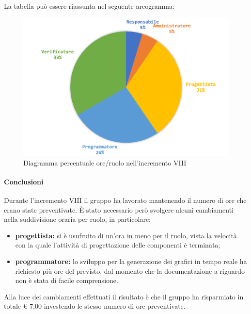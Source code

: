 		
		La tabella può essere riassunta nel seguente areogramma:
		\begin{figure}[H]
			\centering
			\includegraphics[width=0.8\linewidth]{images/consuntivo/ConsIncr8-2.png}
			\caption{Diagramma percentuale ore/ruolo nell'incremento VIII}
			\label{fig:consuntivo diagramma costi ruolo incremento VIII}
		\end{figure}
		
		\paragraph{Conclusioni}
			Durante l'incremento VIII il gruppo ha lavorato mantenendo il numero di ore che erano state preventivate. È stato necessario però svolgere alcuni cambiamenti nella suddivisione oraria per ruolo, in particolare:
		\begin{itemize}
			\item \textbf{progettista:} si è usufruito di un'ora in meno per il ruolo, vista la velocità con la quale l'attività di progettazione delle componenti è terminata;
			\item \textbf{programmatore:} lo sviluppo per la generazione dei grafici in tempo reale ha richiesto più ore del previsto, dal momento che la documentazione a riguardo non è stata di facile comprensione. 
		\end{itemize}
			Alla luce dei cambiamenti effettuati il risultato è che il gruppo ha risparmiato in totale € 7,00 investendo le stesso numero di ore preventivate.
		
